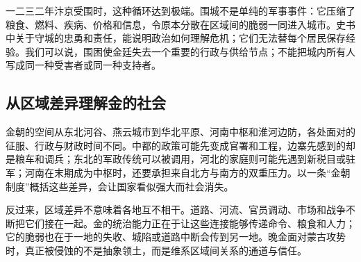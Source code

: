 一二三二年汴京受围时，这种循环达到极端。围城不是单纯的军事事件：它压缩了粮食、燃料、疾病、价格和信息，令原本分散在区域间的脆弱一同进入城市。史书中关于守城的忠勇和责任，能说明政治如何理解危机；它们无法替每个居民保存经验。我们可以说，围困使金廷失去一个重要的行政与供给节点；不能把城内所有人写成同一种受害者或同一种支持者。

\subsection{从区域差异理解金的社会}

金朝的空间从东北河谷、燕云城市到华北平原、河南中枢和淮河边防，各处面对的征服、行政与财政时间不同。中都的政策可能先变成官署和工程，边寨先感到的却是粮车和调兵；东北的军政传统可以被调用，河北的家庭则可能先遇到新税目或驻军；河南在末期成为中枢时，还要承担来自北方与南方的双重压力。以一条“金朝制度”概括这些差异，会让国家看似强大而社会消失。

反过来，区域差异不意味着各地互不相干。道路、河流、官员调动、市场和战争不断把它们接在一起。金的统治能力正在于让这些连接能够传递命令、粮食和人力；它的脆弱也在于一地的失收、城陷或道路中断会传到另一地。晚金面对蒙古攻势时，真正被侵蚀的不是抽象领土，而是维系区域间关系的通道与信任。
